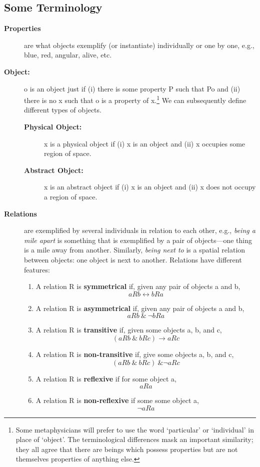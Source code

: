 \documentclass[oneside]{article}
\begin{document}
\subsection*{Some Terminology}
\begin{description}
\item[\textbf{Properties}] are what objects exemplify (or instantiate)
individually or one by one, e.g., blue, red, angular, alive, etc.
\item[\textbf{Object:}] o is an object just if (i) there is some property P such that Po and
(ii) there is no x such that o is a property of x.\footnote{Some
  metaphysicians will prefer to use the word `particular' or
  `individual' in place of `object'. The terminological differences mask
  an important similarity; they all agree that there are beings which
  possess properties but are not themselves properties of anything else.} We can subsequently define different types of objects.
\begin{description}
\item[\textbf{Physical Object:}]
x is a physical object if (i) x is an object and (ii) x occupies some
region of space.
\item[\textbf{Abstract Object:}]
x is an abstract object if (i) x is an object and (ii) x does not occupy
a region of space.
\end{description}

\item[\textbf{Relations}] are exemplified by several individuals in relation to
each other, e.g., \emph{being a mile apart} is something that is
exemplified by a pair of objects---one thing is a mile away from
another. Similarly, \emph{being next to} is a spatial relation between
objects: one object is next to another. Relations have different features:

\begin{enumerate}
\item
  A relation R is \textbf{symmetrical} if, given any pair of objects a
  and b, \[ aRb \leftrightarrow bRa \]
\item
  A relation R is \textbf{asymmetrical} if, given any pair of objects a
  and b, \[ aRb\ \&\  \neg bRa\]
\item
  A relation R is \textbf{transitive} if, given some objects a, b, and
  c, \[ (aRb\ \&\ bRc) \rightarrow aRc \]
\item
  A relation R is \textbf{non-transitive} if, give some objects a, b,
  and c, \[ (aRb\  \&\  bRc)\ \& \neg aRc \]
\item
  A relation R is \textbf{reflexive} if for some object a, \[ aRa \]
\item
  A relation R is \textbf{non-reflexive} if some some object a,
  \[ \neg aRa \]
\end{enumerate}
\end{description}
\end{document}
